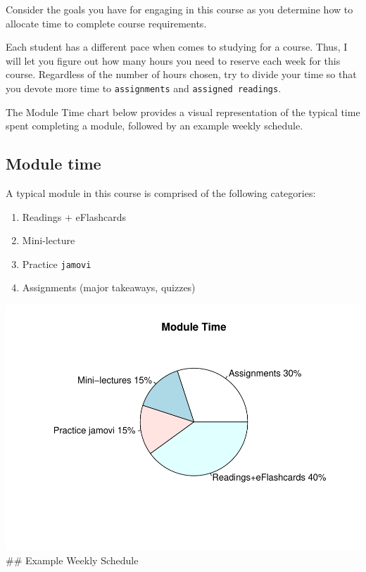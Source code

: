 \documentclass[11pt,]{article}
\makeatletter
\providecommand{\tightlist}{%
  \setlength{\itemsep}{0pt}\setlength{\parskip}{0pt}}
\def\maxwidth{\ifdim\Gin@nat@width>\linewidth\linewidth
\else\Gin@nat@width\fi}
\let\Oldincludegraphics\includegraphics
\renewcommand{\includegraphics}[1]{\Oldincludegraphics[width=\maxwidth]{#1}}
\makeatother
\begin{document}
Consider the goals you have for engaging in this course as you determine
how to allocate time to complete course requirements.

Each student has a different pace when comes to studying for a course.
Thus, I will let you figure out how many hours you need to reserve each
week for this course. Regardless of the number of hours chosen, try to
divide your time so that you devote more time to \texttt{assignments}
and \texttt{assigned\ readings}.

The Module Time chart below provides a visual representation of the
typical time spent completing a module, followed by an example weekly
schedule.

\hypertarget{module-time}{%
\subsection{Module time}\label{module-time}}

A typical module in this course is comprised of the following
categories:

\begin{enumerate}
\def\labelenumi{\arabic{enumi}.}
\tightlist
\item
  Readings + eFlashcards
\item
  Mini-lecture
\item
  Practice \texttt{jamovi}
\item
  Assignments (major takeaways, quizzes)
\end{enumerate}

\includegraphics{KIN610-FA21_files/figure-latex/unnamed-chunk-1-1.pdf}
\#\# Example Weekly Schedule
\end{document}
